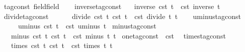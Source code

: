 \begin{isabellebody}
\isamarkupfalse%
\ tag{\isacharunderscore}const\ {\isacharcolon}{\isacharcolon}{\isacharparenleft}field{\isacharparenright}field\isanewline
{}\isanewline
\ \ \isamarkupfalse%
\ inverse{\isacharunderscore}tag{\isacharunderscore}const\isanewline
\ \ \ {\isacartoucheopen}inverse\ {\isacharparenleft}{\isasymtau}\isactrlsub c\isactrlsub s\isactrlsub t\ t{\isacharparenright}\ {\isacharequal}\ {\isasymtau}\isactrlsub c\isactrlsub s\isactrlsub t\ {\isacharparenleft}inverse\ t{\isacharparenright}{\isacartoucheclose}\isanewline
\isanewline
\ \ \isamarkupfalse%
\ divide{\isacharunderscore}tag{\isacharunderscore}const\ \isanewline
\ \ \ \ \ {\isacartoucheopen}divide\ {\isacharparenleft}{\isasymtau}\isactrlsub c\isactrlsub s\isactrlsub t\ t\ {\isacharparenleft}{\isasymtau}\isactrlsub c\isactrlsub s\isactrlsub t\ t\ {\isacharequal}\ {\isasymtau}\isactrlsub c\isactrlsub s\isactrlsub t\ {\isacharparenleft}divide\ t\ t\isanewline
\isanewline
\ \ \isamarkupfalse%
\ uminus{\isacharunderscore}tag{\isacharunderscore}const\isanewline
\ \ \ \ \ {\isacartoucheopen}uminus\ {\isacharparenleft}{\isasymtau}\isactrlsub c\isactrlsub s\isactrlsub t\ t{\isacharparenright}\ {\isacharequal}\ {\isasymtau}\isactrlsub c\isactrlsub s\isactrlsub t\ {\isacharparenleft}uminus\ t{\isacharparenright}{\isacartoucheclose}\isanewline
\isanewline
{}\isamarkupfalse%
\ minus{\isacharunderscore}tag{\isacharunderscore}const\isanewline
\ \ \ {\isacartoucheopen}minus\ {\isacharparenleft}{\isasymtau}\isactrlsub c\isactrlsub s\isactrlsub t\ t\ {\isacharparenleft}{\isasymtau}\isactrlsub c\isactrlsub s\isactrlsub t\ t\ {\isacharequal}\ {\isasymtau}\isactrlsub c\isactrlsub s\isactrlsub t\ {\isacharparenleft}minus\ t\ t\isanewline
\isanewline
{}\isamarkupfalse%
\ {\isacartoucheopen}one{\isacharunderscore}tag{\isacharunderscore}const\ {\isasymequiv}\ {\isasymtau}\isactrlsub c\isactrlsub s\isactrlsub t\ {}{\isacartoucheclose}\isanewline
\isanewline
{}\isamarkupfalse%
\ times{\isacharunderscore}tag{\isacharunderscore}const\isanewline
\ \ \ {\isacartoucheopen}times\ {\isacharparenleft}{\isasymtau}\isactrlsub c\isactrlsub s\isactrlsub t\ t\ {\isacharparenleft}{\isasymtau}\isactrlsub c\isactrlsub s\isactrlsub t\ t\ {\isacharequal}\ {\isasymtau}\isactrlsub c\isactrlsub s\isactrlsub t\ {\isacharparenleft}times\ t\ t\isanewline

\end{isabellebody}
